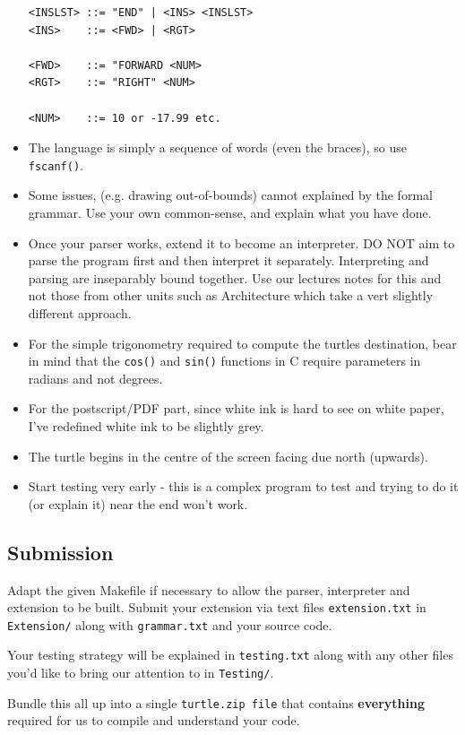\begin{exercise}
\begin{itemize}
{\begin{verbatim}
<INSLST> ::= "END" | <INS> <INSLST>
<INS>    ::= <FWD> | <RGT>

<FWD>    ::= "FORWARD <NUM>
<RGT>    ::= "RIGHT" <NUM>

<NUM>    ::= 10 or -17.99 etc.
\end{verbatim}
}

\item The language is simply a sequence of words (even the braces),
so use \verb^fscanf()^.

\item Some issues, (e.g. drawing out-of-bounds)
cannot explained by the formal
grammar. Use your own common-sense, and explain what you have done.

\item Once your parser works, extend it to become an interpreter. DO NOT
aim to parse the program first and then interpret it separately. Interpreting
and parsing are inseparably bound together. Use our lectures notes for this
and not those from other units such as Architecture which take a vert slightly
different approach.

\item For the simple trigonometry required to compute the turtles destination,
bear in mind that the \verb^cos()^ and \verb^sin()^ functions in C require parameters
in radians and not degrees.

\item For the postscript/PDF part, since white ink is hard to see on white paper, I've
redefined white ink to be slightly grey.

\item The turtle begins in the centre of the screen facing due north (upwards).

\item Start testing very early - this is a complex program to test and trying to
do it (or explain it) near the end won't work.

\end{itemize}

\subsection*{Submission}
Adapt the given Makefile if necessary to allow the parser, interpreter and extension to 
be built.
Submit your extension via text files \verb^extension.txt^ in \verb^Extension/^ along with  \verb^grammar.txt^ and your source code.

Your testing strategy will be explained in \verb^testing.txt^ along with any other files you'd like to bring our attention to in \verb^Testing/^.

Bundle this all up into a single \verb^turtle.zip file^ that contains {\bf everything} required
for us to compile and understand your code.

\end{exercise}
